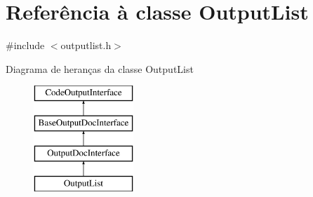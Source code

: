 \hypertarget{class_output_list}{\section{Referência à classe Output\-List}
\label{class_output_list}
}


{\ttfamily \#include $<$outputlist.\-h$>$}

Diagrama de heranças da classe Output\-List\begin{figure}[H]
\begin{center}
\leavevmode
\includegraphics[height=4.000000cm]{class_output_list}
\end{center}
\end{figure}
